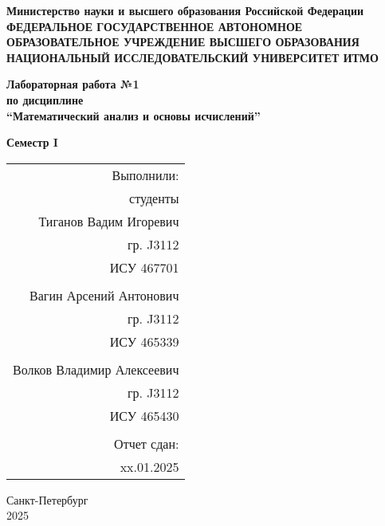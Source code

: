 \documentclass[a4paper,12pt]{article}
\begin{document}
\thispagestyle{empty} %

\begin{center}
    \textbf{Министерство науки и высшего образования Российской Федерации}\\
    \textbf{ФЕДЕРАЛЬНОЕ ГОСУДАРСТВЕННОЕ АВТОНОМНОЕ ОБРАЗОВАТЕЛЬНОЕ УЧРЕЖДЕНИЕ ВЫСШЕГО ОБРАЗОВАНИЯ НАЦИОНАЛЬНЫЙ ИССЛЕДОВАТЕЛЬСКИЙ УНИВЕРСИТЕТ ИТМО}
\end{center}

\vspace{1cm}

\begin{center}
    \textbf{Лабораторная работа №1}\\
    \textbf{по дисциплине}\\
    \textbf{``Математический анализ и основы исчислений''}
\end{center}

\vspace{1cm}

\begin{center}
    \textbf{Семестр I}
\end{center}

\vspace{2cm}

\begin{flushright}
    \begin{tabular}{r}
        Выполнили: \\ \vspace{0.5cm}
        студенты \\ 
        Тиганов Вадим Игоревич \\
        гр. J3112 \\
        ИСУ 467701 \\
        \\
        Вагин Арсений Антонович \\
        гр. J3112 \\
        ИСУ 465339 \\
        \\
        Волков Владимир Алексеевич \\
        гр. J3112 \\
        ИСУ 465430\\
        \\
        Отчет сдан: \\
        xx.01.2025
    \end{tabular}
\end{flushright}

\vspace{5cm}

\begin{center}
    Санкт-Петербург \\
    2025
\end{center}






\end{document}
